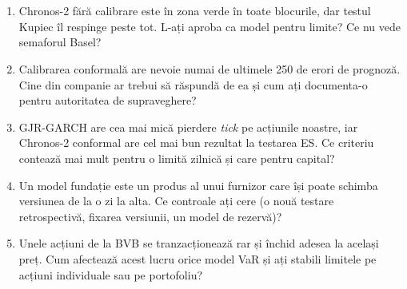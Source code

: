 \section{}
\begin{enumerate}
\item {}%
{Chronos-2 fără calibrare este în zona verde în toate blocurile, dar testul Kupiec îl respinge peste tot. L-ați aproba ca model pentru limite? Ce nu vede semaforul Basel?}
\item {}%
{Calibrarea conformală are nevoie numai de ultimele 250 de erori de prognoză. Cine din companie ar trebui să răspundă de ea și cum ați documenta-o pentru autoritatea de supraveghere?}
\item {}%
{GJR-GARCH are cea mai mică pierdere \emph{tick} pe acțiunile noastre, iar Chronos-2 conformal are cel mai bun rezultat la testarea ES. Ce criteriu contează mai mult pentru o limită zilnică și care pentru capital?}
\item {}%
{Un model fundație este un produs al unui furnizor care își poate schimba versiunea de la o zi la alta. Ce controale ați cere (o nouă testare retrospectivă, fixarea versiunii, un model de rezervă)?}
\item {}%
{Unele acțiuni de la BVB se tranzacționează rar și închid adesea la același preț. Cum afectează acest lucru orice model VaR și ați stabili limitele pe acțiuni individuale sau pe portofoliu?}
\end{enumerate}

